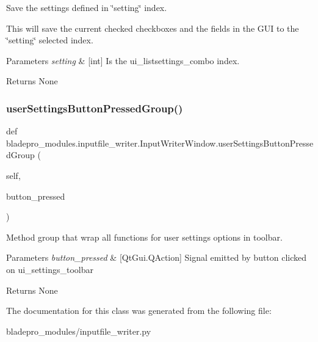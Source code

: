 Save the settings defined in \char`\"{}setting\char`\"{} index. 

This will save the current checked checkboxes and the fields in the G\+UI to the \char`\"{}setting\char`\"{} selected index.


\begin{DoxyParams}{Parameters}
{\em setting} & \mbox{[}int\mbox{]} Is the ui\+\_\+listsettings\+\_\+combo index. \\
\hline
\end{DoxyParams}
\begin{DoxyReturn}{Returns}
None 
\end{DoxyReturn}
\hypertarget{a00071_a1b508dd4cb9c699a1769e7727d1e6fc1}{}\label{a00071_a1b508dd4cb9c699a1769e7727d1e6fc1} 
\subsubsection{\texorpdfstring{user\+Settings\+Button\+Pressed\+Group()}{userSettingsButtonPressedGroup()}}
{\footnotesize\ttfamily def bladepro\+\_\+modules.\+inputfile\+\_\+writer.\+Input\+Writer\+Window.\+user\+Settings\+Button\+Pressed\+Group (\begin{DoxyParamCaption}\item[{}]{self,  }\item[{}]{button\+\_\+pressed }\end{DoxyParamCaption})}



Method group that wrap all functions for user settings options in toolbar. 


\begin{DoxyParams}{Parameters}
{\em button\+\_\+pressed} & \mbox{[}Qt\+Gui.\+Q\+Action\mbox{]} Signal emitted by button clicked on ui\+\_\+settings\+\_\+toolbar \\
\hline
\end{DoxyParams}
\begin{DoxyReturn}{Returns}
None 
\end{DoxyReturn}


The documentation for this class was generated from the following file\+:\begin{DoxyCompactItemize}
\item 
bladepro\+\_\+modules/inputfile\+\_\+writer.\+py\end{DoxyCompactItemize}
